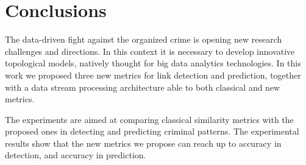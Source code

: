 \section{Conclusions}
\label{sec:conclusions}

The data-driven fight against the organized crime is opening new research challenges and directions. 
In this context it is necessary to develop innovative topological models, natively thought for big data analytics technologies.
In this work we proposed three new metrics for link detection and prediction, together with a data stream processing architecture able to both classical and new metrics.

The experiments are aimed at comparing classical similarity metrics with the proposed ones in detecting and predicting criminal patterns. The experimental results show that the new metrics we propose can reach up to  accuracy in detection, and  accuracy in prediction.
